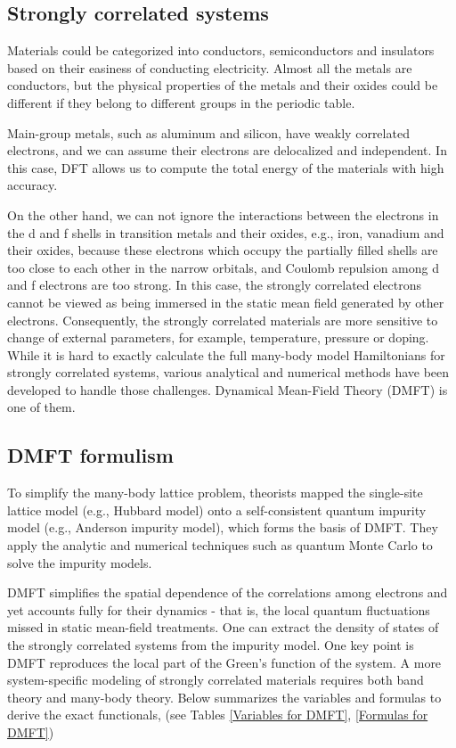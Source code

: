 \documentclass[12 pt]{article}
\begin{document}
      \subsection{Strongly correlated systems}

  Materials could be categorized into conductors, semiconductors and insulators based on their easiness of conducting 
electricity. Almost all the metals are conductors, but the physical properties of the metals and their oxides could 
be different if they belong to different groups in the periodic table. 

  Main-group metals, such as aluminum and silicon, have weakly correlated electrons, and we can assume their 
electrons are delocalized and independent. In this case, DFT allows us to compute the total energy of the materials 
with high accuracy. 

  On the other hand, we can not ignore the interactions between the electrons in the d and f shells in transition 
metals and their oxides, e.g., iron, vanadium and their oxides, because these electrons which occupy the partially 
filled shells are too close to each other in the narrow orbitals, and Coulomb repulsion among d and f electrons are too 
strong. In this case, the strongly correlated electrons cannot be viewed as being immersed in the static mean field 
generated by other electrons. Consequently, the strongly correlated materials are more sensitive to change of 
external parameters, for example, temperature, pressure or doping. While it is hard to exactly calculate the full 
many-body model Hamiltonians for strongly correlated systems, various analytical and numerical methods have been 
developed to handle those challenges. Dynamical Mean-Field Theory (DMFT) is one of them.

      \subsection{DMFT formulism}

  To simplify the many-body lattice problem, theorists mapped the single-site lattice model (e.g., Hubbard model) 
onto a self-consistent quantum impurity model (e.g., Anderson impurity model), which forms the basis of DMFT. They 
apply the analytic and numerical techniques such as quantum Monte Carlo to solve the impurity models. 

  DMFT simplifies the spatial dependence of the correlations among electrons and yet accounts fully for their 
dynamics - that is, the local quantum fluctuations missed in static mean-field treatments. One can extract the 
density of states of the strongly correlated systems from the impurity model. One key point is DMFT reproduces the 
local part of the Green's function of the system. A more system-specific modeling of strongly correlated materials 
requires both band theory and many-body theory. Below summarizes the variables and formulas to derive the exact 
functionals, (see Tables \ref{Variables for DMFT}, \ref{Formulas for DMFT}) \citep {Kotliar2006}	
\end{document}

